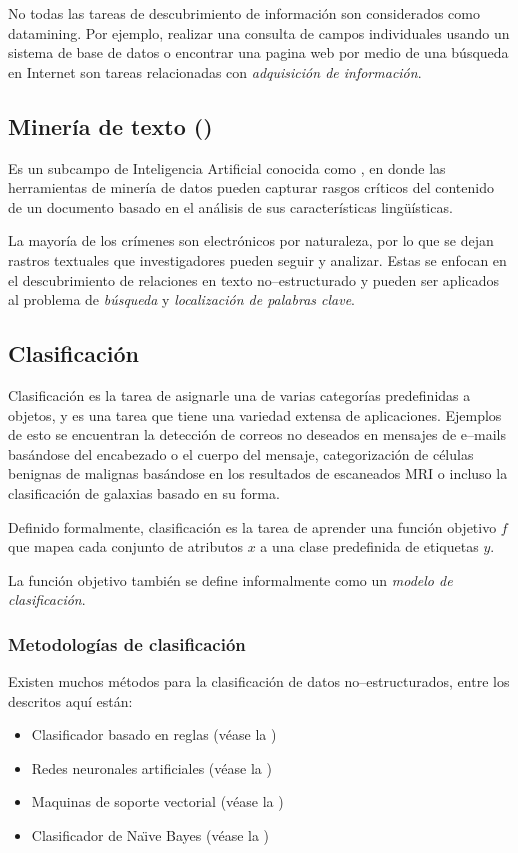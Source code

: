 No todas las tareas de descubrimiento de información son considerados como \gls{datamining}. Por ejemplo, realizar una consulta de campos individuales usando un sistema de base de datos o encontrar una pagina web por medio de una búsqueda en Internet son tareas relacionadas con \emph{adquisición de información}.

\subsection{Minería de texto ()} \label{subsec:NLP}
Es un subcampo de Inteligencia Artificial conocida como , en donde las herramientas de minería de datos pueden capturar rasgos críticos del contenido de un documento basado en el análisis de sus características lingüísticas.

La mayoría de los crímenes son electrónicos por naturaleza, por lo que se dejan rastros textuales que investigadores pueden seguir y analizar. Estas se enfocan en el descubrimiento de relaciones en texto no--estructurado y pueden ser aplicados al problema de \emph{búsqueda} y \emph{localización de palabras clave}.

\subsection{Clasificación} \label{subsec:clasification}
Clasificación es la tarea de asignarle una de varias categorías predefinidas a objetos, y es una tarea que tiene una variedad extensa de aplicaciones. Ejemplos de esto se encuentran la detección de correos no deseados en mensajes de e--mails basándose del encabezado o el cuerpo del mensaje, categorización de células benignas de malignas basándose en los resultados de escaneados MRI o incluso la clasificación de galaxias basado en su forma.

Definido formalmente, clasificación es la tarea de aprender una función objetivo $f$ que mapea cada conjunto de atributos $x$ a una clase predefinida de etiquetas $y$.

La función objetivo también se define informalmente como un \emph{modelo de clasificación}.

\subsubsection{Metodologías de clasificación} \label{subsubsec:classmethods}
Existen muchos métodos para la clasificación de datos no--estructurados, entre los descritos aquí están:
\begin{itemize}
\item Clasificador basado en reglas (véase la )
\item Redes neuronales artificiales (véase la )
\item Maquinas de soporte vectorial (véase la )
\item Clasificador de Na\"{\i}ve Bayes (véase la )
\end{itemize}


